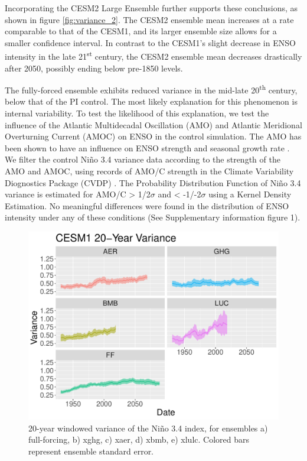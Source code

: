 \documentclass[11pt]{article}
\begin{document}
Incorporating the CESM2 Large Ensemble further supports these conclusions, as shown in figure \ref{fig:variance_2}. The CESM2 ensemble mean increases at a rate comparable to that of the CESM1, and its larger ensemble size allows for a smaller confidence interval. In contrast to the CESM1's slight decrease in ENSO intensity in the late 21\textsuperscript{st} century, the CESM2 ensemble mean decreases drastically after 2050, possibly ending below pre-1850 levels.

The fully-forced ensemble exhibits reduced variance in the mid-late 20\textsuperscript{th} century, below that of the PI control. The most likely explanation for this phenomenon is internal variability. To test the likelihood of this explanation, we test the influence of the Atlantic Multidecadal Oscillation (AMO) and Atlantic Meridional Overturning Current (AMOC) on ENSO in the control simulation. The AMO has been shown to have an influence on ENSO strength and seasonal growth rate \citep{levine2017impact}. We filter the control Niño 3.4 variance data according to the strength of the AMO and AMOC, using records of AMO/C strength in the Climate Variability Diognostics Package (CVDP) \citep{phillips2014evaluating}. The Probability Distribution Function of Niño 3.4 variance is estimated for AMO/C > 1/2\(\sigma\) and < -1/-2\(\sigma\) using a Kernel Density Estimation. No meaningful differences were found in the distribution of ENSO intensity under any of these conditions (See Supplementary information figure 1).

\begin{figure}
\centering
\includegraphics[width=.8\linewidth]{../../data/figures/cesm1.pdf}
\caption{\label{fig:variance_1}20-year windowed variance of the Niño 3.4 index, for ensembles a) full-forcing, b) xghg, c) xaer, d) xbmb, e) xlulc. Colored bars represent ensemble standard error.}
\end{figure}
\end{document}
